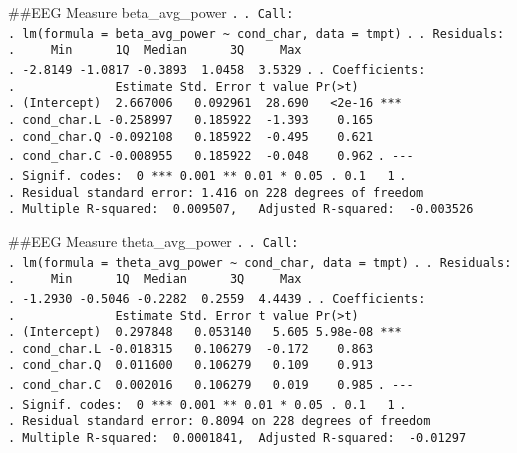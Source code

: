 \documentclass[
]{article}
\begin{document}
\#\#EEG Measure beta\_avg\_power \texttt{.} \texttt{.\ Call:}
\texttt{.\ lm(formula\ =\ beta\_avg\_power\ \textasciitilde{}\ cond\_char,\ data\ =\ tmpt)}
\texttt{.} \texttt{.\ Residuals:}
\texttt{.\ \ \ \ \ Min\ \ \ \ \ \ 1Q\ \ Median\ \ \ \ \ \ 3Q\ \ \ \ \ Max}
\texttt{.\ -2.8149\ -1.0817\ -0.3893\ \ 1.0458\ \ 3.5329} \texttt{.}
\texttt{.\ Coefficients:}
\texttt{.\ \ \ \ \ \ \ \ \ \ \ \ \ \ Estimate\ Std.\ Error\ t\ value\ Pr(\textgreater{}\textbar{}t\textbar{})}
\texttt{.\ (Intercept)\ \ 2.667006\ \ \ 0.092961\ \ 28.690\ \ \ \textless{}2e-16\ ***}
\texttt{.\ cond\_char.L\ -0.258997\ \ \ 0.185922\ \ -1.393\ \ \ \ 0.165}
\texttt{.\ cond\_char.Q\ -0.092108\ \ \ 0.185922\ \ -0.495\ \ \ \ 0.621}
\texttt{.\ cond\_char.C\ -0.008955\ \ \ 0.185922\ \ -0.048\ \ \ \ 0.962}
\texttt{.\ -\/-\/-}
\texttt{.\ Signif.\ codes:\ \ 0\ \textquotesingle{}***\textquotesingle{}\ 0.001\ \textquotesingle{}**\textquotesingle{}\ 0.01\ \textquotesingle{}*\textquotesingle{}\ 0.05\ \textquotesingle{}.\textquotesingle{}\ 0.1\ \textquotesingle{}\ \textquotesingle{}\ 1}
\texttt{.}
\texttt{.\ Residual\ standard\ error:\ 1.416\ on\ 228\ degrees\ of\ freedom}
\texttt{.\ Multiple\ R-squared:\ \ 0.009507,\ \ \ Adjusted\ R-squared:\ \ -0.003526}

\#\#EEG Measure theta\_avg\_power \texttt{.} \texttt{.\ Call:}
\texttt{.\ lm(formula\ =\ theta\_avg\_power\ \textasciitilde{}\ cond\_char,\ data\ =\ tmpt)}
\texttt{.} \texttt{.\ Residuals:}
\texttt{.\ \ \ \ \ Min\ \ \ \ \ \ 1Q\ \ Median\ \ \ \ \ \ 3Q\ \ \ \ \ Max}
\texttt{.\ -1.2930\ -0.5046\ -0.2282\ \ 0.2559\ \ 4.4439} \texttt{.}
\texttt{.\ Coefficients:}
\texttt{.\ \ \ \ \ \ \ \ \ \ \ \ \ \ Estimate\ Std.\ Error\ t\ value\ Pr(\textgreater{}\textbar{}t\textbar{})}
\texttt{.\ (Intercept)\ \ 0.297848\ \ \ 0.053140\ \ \ 5.605\ 5.98e-08\ ***}
\texttt{.\ cond\_char.L\ -0.018315\ \ \ 0.106279\ \ -0.172\ \ \ \ 0.863}
\texttt{.\ cond\_char.Q\ \ 0.011600\ \ \ 0.106279\ \ \ 0.109\ \ \ \ 0.913}
\texttt{.\ cond\_char.C\ \ 0.002016\ \ \ 0.106279\ \ \ 0.019\ \ \ \ 0.985}
\texttt{.\ -\/-\/-}
\texttt{.\ Signif.\ codes:\ \ 0\ \textquotesingle{}***\textquotesingle{}\ 0.001\ \textquotesingle{}**\textquotesingle{}\ 0.01\ \textquotesingle{}*\textquotesingle{}\ 0.05\ \textquotesingle{}.\textquotesingle{}\ 0.1\ \textquotesingle{}\ \textquotesingle{}\ 1}
\texttt{.}
\texttt{.\ Residual\ standard\ error:\ 0.8094\ on\ 228\ degrees\ of\ freedom}
\texttt{.\ Multiple\ R-squared:\ \ 0.0001841,\ \ Adjusted\ R-squared:\ \ -0.01297}
\end{document}
